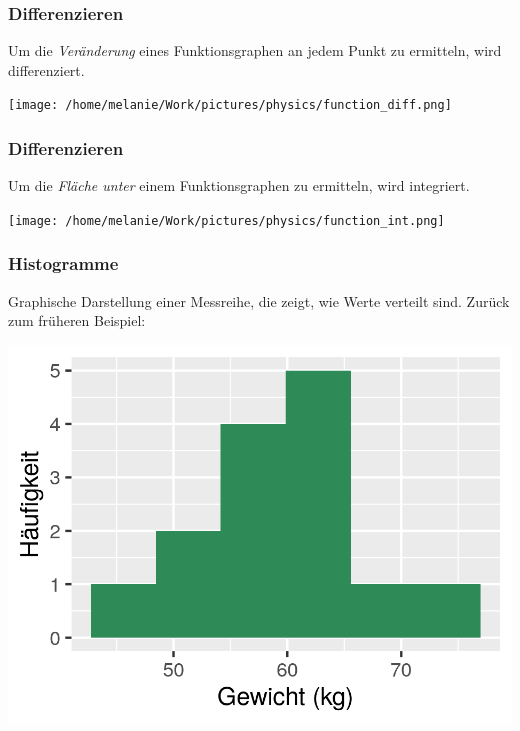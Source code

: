 \documentclass{beamer}
\begin{document}
\begin{frame}
\frametitle{Differenzieren}

Um die \emph{Veränderung} eines Funktionsgraphen an jedem Punkt zu ermitteln, wird differenziert.

\begin{center}
\texttt{[image: /home/melanie/Work/pictures/physics/function\_diff.png]}
\end{center}


\end{frame}


\begin{frame}
\frametitle{Differenzieren}

Um die \emph{Fläche unter} einem Funktionsgraphen zu ermitteln, wird integriert.

\begin{center}
\texttt{[image: /home/melanie/Work/pictures/physics/function\_int.png]}
\end{center}


\end{frame}





\begin{frame}
\frametitle{Histogramme}

Graphische Darstellung einer Messreihe, die zeigt, wie Werte verteilt sind. Zurück zum früheren Beispiel:


\begin{center}
\includegraphics{histogram.png}
\end{center}


\end{frame}
\end{document}
